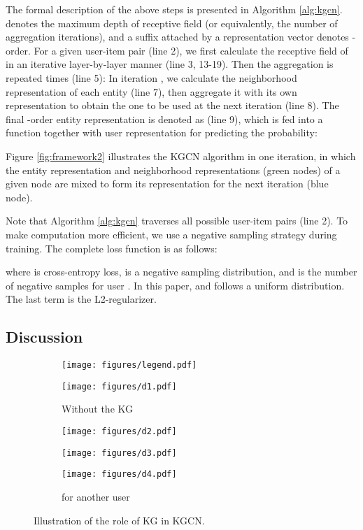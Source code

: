 \documentclass[sigconf]{acmart}
\begin{document}
		The formal description of the above steps is presented in Algorithm \ref{alg:kgcn}.
		 denotes the maximum depth of receptive field (or equivalently, the number of aggregation iterations), and a suffix  attached by a representation vector denotes -order.
		For a given user-item pair  (line 2), we first calculate the receptive field  of  in an iterative layer-by-layer manner (line 3, 13-19).
		Then the aggregation is repeated  times (line 5):
		In iteration , we calculate the neighborhood representation of each entity  (line 7), then aggregate it with its own representation  to obtain the one to be used at the next iteration (line 8).
		The final -order entity representation is denoted as  (line 9), which is fed into a function  together with user representation  for predicting the probability:
		
		
		Figure \ref{fig:framework2} illustrates the KGCN algorithm in one iteration, in which the entity representation  and neighborhood representations (green nodes) of a given node are mixed to form its representation for the next iteration (blue node).
		
		Note that Algorithm \ref{alg:kgcn} traverses all possible user-item pairs (line 2).
		To make computation more efficient, we use a negative sampling strategy during training.
		The complete loss function is as follows:
		
		where  is cross-entropy loss,  is a negative sampling distribution, and  is the number of negative samples for user .
		In this paper,  and  follows a uniform distribution.
		The last term is the L2-regularizer.

	\iffalse
	\subsection{Discussion}
	\label{sec:discussion}
		\begin{figure}
			\centering
			\begin{subfigure}[b]{0.48\textwidth}
   				\texttt{[image: figures/legend.pdf]}
			\end{subfigure}
			\hfill
			\begin{subfigure}[b]{0.21\textwidth}
   				\texttt{[image: figures/d1.pdf]}
   				\caption{Without the KG}
   				\label{fig:d1}
			\end{subfigure}
			\hfill
			\begin{subfigure}[b]{0.21\textwidth}
				\texttt{[image: figures/d2.pdf]}
				\caption{}
				\label{fig:d2}
			\end{subfigure}
			\hfill
			\begin{subfigure}[b]{0.21\textwidth}
   				\texttt{[image: figures/d3.pdf]}
   				\caption{}
   				\label{fig:d3}
			\end{subfigure}
			\hfill
			\begin{subfigure}[b]{0.21\textwidth}
				\texttt{[image: figures/d4.pdf]}
				\caption{ for another user}
				\label{fig:d4}
			\end{subfigure}
			\caption{Illustration of the role of KG in KGCN.}			
			\label{fig:discussion}
		\end{figure}	
	
\end{document}
